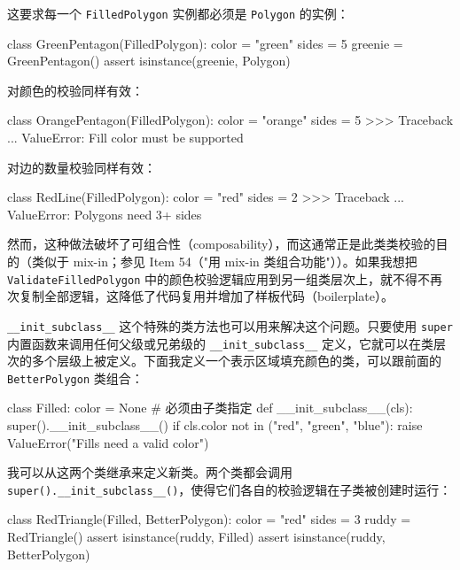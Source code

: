 这要求每一个 \texttt{FilledPolygon} 实例都必须是 \texttt{Polygon} 的实例：

\begin{codebox}[python]
class GreenPentagon(FilledPolygon):
    color = "green"
    sides = 5
greenie = GreenPentagon()
assert isinstance(greenie, Polygon)
\end{codebox}

对颜色的校验同样有效：

\begin{codebox}[python]
class OrangePentagon(FilledPolygon):
    color = "orange"
    sides = 5
>>>
Traceback ...
ValueError: Fill color must be supported
\end{codebox}

对边的数量校验同样有效：

\begin{codebox}[python]
class RedLine(FilledPolygon):
    color = "red"
    sides = 2
>>>
Traceback ...
ValueError: Polygons need 3+ sides
\end{codebox}

然而，这种做法破坏了可组合性（composability），而这通常正是此类类校验的目的（类似于 mix-in；参见 Item 54（"用 mix-in 类组合功能"））。如果我想把 \texttt{ValidateFilledPolygon} 中的颜色校验逻辑应用到另一组类层次上，就不得不再次复制全部逻辑，这降低了代码复用并增加了样板代码（boilerplate）。

\texttt{\_\_init\_subclass\_\_} 这个特殊的类方法也可以用来解决这个问题。只要使用 \texttt{super} 内置函数来调用任何父级或兄弟级的 \texttt{\_\_init\_subclass\_\_} 定义，它就可以在类层次的多个层级上被定义。下面我定义一个表示区域填充颜色的类，可以跟前面的 \texttt{BetterPolygon} 类组合：

\begin{codebox}[python]
class Filled:
    color = None  # 必须由子类指定
    def __init_subclass__(cls):
        super().__init_subclass__()
        if cls.color not in ("red", "green", "blue"):
            raise ValueError("Fills need a valid color")
\end{codebox}

我可以从这两个类继承来定义新类。两个类都会调用 \texttt{super().\_\_init\_subclass\_\_()}，使得它们各自的校验逻辑在子类被创建时运行：

\begin{codebox}[python]
class RedTriangle(Filled, BetterPolygon):
    color = "red"
    sides = 3
ruddy = RedTriangle()
assert isinstance(ruddy, Filled)
assert isinstance(ruddy, BetterPolygon)
\end{codebox}

